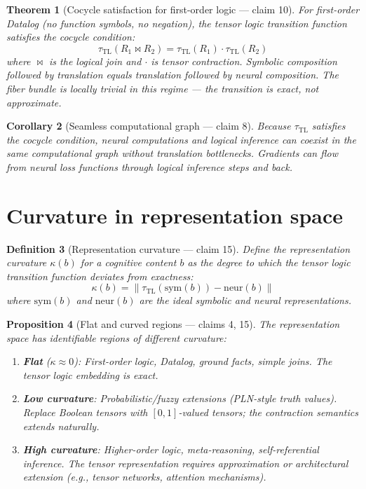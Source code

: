 \documentclass[11pt,a4paper]{article}
\newtheorem{definition}{Definition}[section]
\newtheorem{theorem}[definition]{Theorem}
\newtheorem{proposition}[definition]{Proposition}
\newtheorem{corollary}[definition]{Corollary}
\begin{document}
\begin{theorem}[Cocycle satisfaction for first-order logic --- claim 10]
\label{thm:cocycle}
For first-order Datalog (no function symbols, no negation), the tensor
logic transition function satisfies the cocycle condition:
\[
  \tau_{\text{TL}}(R_1 \bowtie R_2) = \tau_{\text{TL}}(R_1) \cdot \tau_{\text{TL}}(R_2)
\]
where $\bowtie$ is the logical join and $\cdot$ is tensor contraction.
Symbolic composition followed by translation equals translation followed
by neural composition. The fiber bundle is locally trivial in this
regime --- the transition is exact, not approximate.
\end{theorem}

\begin{corollary}[Seamless computational graph --- claim 8]
Because $\tau_{\text{TL}}$ satisfies the cocycle condition, neural
computations and logical inference can coexist in the same computational
graph without translation bottlenecks. Gradients can flow from neural
loss functions through logical inference steps and back.
\end{corollary}

\section{Curvature in representation space}
\label{sec:curvature}

\begin{definition}[Representation curvature --- claim 15]
\label{def:curvature}
Define the \emph{representation curvature} $\kappa(b)$ for a cognitive
content $b$ as the degree to which the tensor logic transition function
deviates from exactness:
\[
  \kappa(b) = \|\tau_{\text{TL}}(\text{sym}(b)) - \text{neur}(b)\|
\]
where $\text{sym}(b)$ and $\text{neur}(b)$ are the ideal symbolic and
neural representations.
\end{definition}

\begin{proposition}[Flat and curved regions --- claims 4, 15]
\label{prop:flat-curved}
The representation space has identifiable regions of different curvature:
\begin{enumerate}
\item \textbf{Flat} ($\kappa \approx 0$): First-order logic, Datalog,
  ground facts, simple joins. The tensor logic embedding is exact.
\item \textbf{Low curvature}: Probabilistic/fuzzy extensions (PLN-style
  truth values). Replace Boolean tensors with $[0,1]$-valued tensors;
  the contraction semantics extends naturally.
\item \textbf{High curvature}: Higher-order logic, meta-reasoning,
  self-referential inference. The tensor representation requires
  approximation or architectural extension (e.g., tensor networks,
  attention mechanisms).
\end{enumerate}
\end{proposition}
\end{document}
